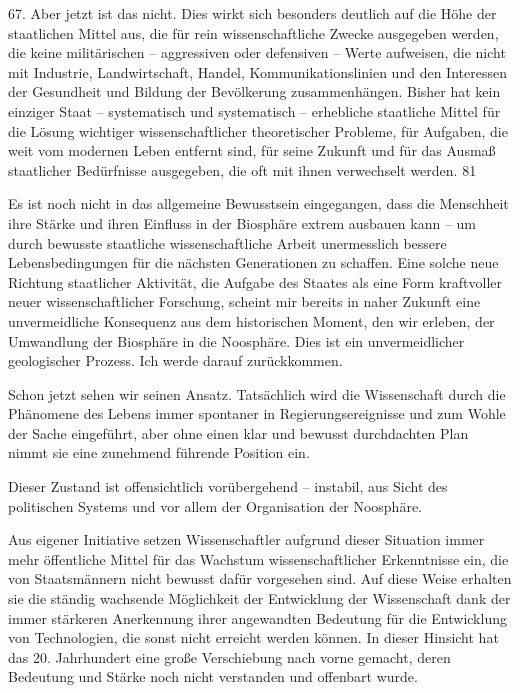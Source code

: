 \documentclass[11pt,a4paper]{book}
\begin{document}
67. Aber jetzt ist das nicht. Dies wirkt sich besonders deutlich auf die Höhe der staatlichen Mittel aus, die für rein wissenschaftliche Zwecke ausgegeben werden, die keine militärischen -- aggressiven oder defensiven -- Werte aufweisen, die nicht mit Industrie, Landwirtschaft, Handel, Kommunikationslinien und den Interessen der Gesundheit und Bildung der Bevölkerung zusammenhängen. Bisher hat kein einziger Staat -- systematisch und systematisch -- erhebliche staatliche Mittel für die Lösung wichtiger wissenschaftlicher theoretischer Probleme, für Aufgaben, die weit vom modernen Leben entfernt sind, für seine Zukunft und für das Ausmaß staatlicher Bedürfnisse ausgegeben, die oft mit ihnen verwechselt werden. 81



Es ist noch nicht in das allgemeine Bewusstsein eingegangen, dass die Menschheit ihre Stärke und ihren Einfluss in der Biosphäre extrem ausbauen kann -- um durch bewusste staatliche wissenschaftliche Arbeit unermesslich bessere Lebensbedingungen für die nächsten Generationen zu schaffen. Eine solche neue Richtung staatlicher Aktivität, die Aufgabe des Staates als eine Form kraftvoller neuer wissenschaftlicher Forschung, scheint mir bereits in naher Zukunft eine unvermeidliche Konsequenz aus dem historischen Moment, den wir erleben, der Umwandlung der Biosphäre in die Noosphäre. Dies ist ein unvermeidlicher geologischer Prozess. Ich werde darauf zurückkommen.



Schon jetzt sehen wir seinen Ansatz. Tatsächlich wird die Wissenschaft durch die Phänomene des Lebens immer spontaner in Regierungsereignisse und zum Wohle der Sache eingeführt, aber ohne einen klar und bewusst durchdachten Plan nimmt sie eine zunehmend führende Position ein.



Dieser Zustand ist offensichtlich vorübergehend -- instabil, aus Sicht des politischen Systems und vor allem der Organisation der Noosphäre.



Aus eigener Initiative setzen Wissenschaftler aufgrund dieser Situation immer mehr öffentliche Mittel für das Wachstum wissenschaftlicher Erkenntnisse ein, die von Staatsmännern nicht bewusst dafür vorgesehen sind. Auf diese Weise erhalten sie die ständig wachsende Möglichkeit der Entwicklung der Wissenschaft dank der immer stärkeren Anerkennung ihrer angewandten Bedeutung für die Entwicklung von Technologien, die sonst nicht erreicht werden können. In dieser Hinsicht hat das 20. Jahrhundert eine große Verschiebung nach vorne gemacht, deren Bedeutung und Stärke noch nicht verstanden und offenbart wurde.
\end{document}

